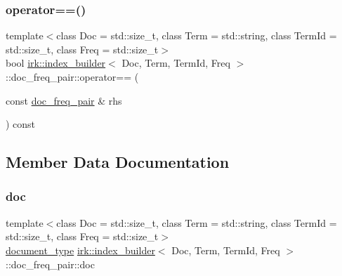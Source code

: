 \subsubsection{\texorpdfstring{operator==()}{operator==()}}
{\footnotesize\ttfamily template$<$class Doc  = std\+::size\+\_\+t, class Term  = std\+::string, class Term\+Id  = std\+::size\+\_\+t, class Freq  = std\+::size\+\_\+t$>$ \\
bool \mbox{\hyperlink{classirk_1_1index__builder}{irk\+::index\+\_\+builder}}$<$ Doc, Term, Term\+Id, Freq $>$\+::doc\+\_\+freq\+\_\+pair\+::operator== (\begin{DoxyParamCaption}\item[{const \mbox{\hyperlink{structirk_1_1index__builder_1_1doc__freq__pair}{doc\+\_\+freq\+\_\+pair}} \&}]{rhs }\end{DoxyParamCaption}) const\hspace{0.3cm}{\ttfamily [inline]}}



\subsection{Member Data Documentation}
\mbox{\label{structirk_1_1index__builder_1_1doc__freq__pair_aa7a0c86b1212dbbe06389ce45ff18d4b}} 
\subsubsection{\texorpdfstring{doc}{doc}}
{\footnotesize\ttfamily template$<$class Doc  = std\+::size\+\_\+t, class Term  = std\+::string, class Term\+Id  = std\+::size\+\_\+t, class Freq  = std\+::size\+\_\+t$>$ \\
\mbox{\hyperlink{classirk_1_1index__builder_a4230ae91e9f84c95ee99b3607c6e952e}{document\+\_\+type}} \mbox{\hyperlink{classirk_1_1index__builder}{irk\+::index\+\_\+builder}}$<$ Doc, Term, Term\+Id, Freq $>$\+::doc\+\_\+freq\+\_\+pair\+::doc}

\mbox{\label{structirk_1_1index__builder_1_1doc__freq__pair_ae71d3afc16b2a295ef6338886639dff7}} 
